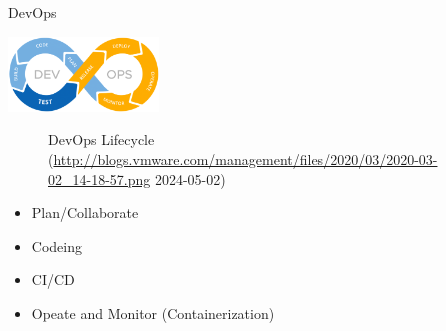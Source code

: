 \documentclass[10pt]{beamer}
\begin{document}
\begin{frame}{DevOps}
	\begin{center}
		\includegraphics[width=4cm]{devops_lifecycle.png}
			\begin{figure}
				\caption{DevOps Lifecycle (\url{http://blogs.vmware.com/management/files/2020/03/2020-03-02_14-18-57.png} 2024-05-02)}
			\end{figure}
	\end{center}

	\begin{itemize}
		\item Plan/Collaborate
		\item Codeing
		\item CI/CD
		\item Opeate and Monitor (Containerization)
	\end{itemize}
\end{frame}
\end{document}
